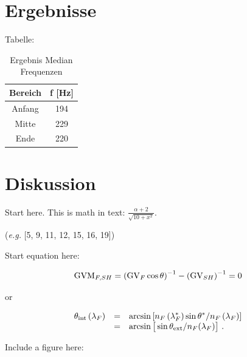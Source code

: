 \section{Ergebnisse}

Tabelle:

\begin{table}[htbp]
\centering
\begin{tabular}{c|c}
Bereich & f [Hz] \\ \hline \hline
Anfang & 194 \\ \hline
Mitte & 229 \\ \hline
Ende & 220
\end{tabular}
\caption{Ergebnis Median Frequenzen}
\label{tab:medfrequ}
\end{table}

\section{Diskussion}


Start here.
This is math in text: $\frac{\alpha + 2}{\sqrt{10 + x^2}}$.


({\it e.g.} [5, 9, 11, 12, 15, 16, 19])

Start equation here:

\begin{equation}
{\rm GVM}_{F,SH} = \left({\rm GV}_F \cos \theta \right )^{-1} -
\left ({\rm GV}_{SH}\right)^{-1} = 0
\end{equation}

or

\begin{equation}
\begin{array}{rcl}
\displaystyle{\theta_{\rm int} \left(\lambda_F\right)} & = &
\displaystyle{\arcsin \left[ n_F
\left(\lambda_{F}^* \right) \sin \theta^* / n_F \left(\lambda_F
\right)\right]}\\
& = & \displaystyle{\arcsin \big [\sin \theta_{\rm ext} / n_F
(\lambda_F)\big]~.}
\end{array}
\end{equation}

\vfill\break

Include a figure here:

